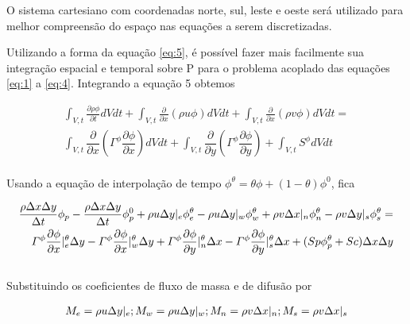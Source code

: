 \documentclass[]{article}
\begin{document}
O sistema cartesiano com coordenadas norte, sul, leste e oeste será utilizado para melhor compreensão do espaço nas equações a serem discretizadas.

Utilizando a forma da equação \eqref{eq:5}, é possível fazer mais facilmente sua integração espacial e temporal sobre P para o problema acoplado das equações \eqref{eq:1} a \eqref{eq:4}. Integrando a equação 5 obtemos

\begin{equation}
	\begin{aligned}
		\int_{V,t}\frac{\partial \rho \phi}{\partial t} dVdt + \int_{V,t}\frac{\partial}{\partial x}(\rho u\phi) dVdt + \int_{V,t}\frac{\partial}{\partial x}(\rho v\phi) dVdt =\\ \int_{V,t}\dfrac{\partial}{\partial x}(\varGamma^{\phi} \dfrac{\partial \phi}{\partial x}) dVdt + \int_{V,t}\dfrac{\partial}{\partial y}(\varGamma^{\phi} \dfrac{\partial \phi}{\partial y}) + \int_{V,t}S^{\phi} dVdt
	\end{aligned}
	\label{eq:5}	
\end{equation}\\

Usando a equação de interpolação de tempo $\phi^{\theta} = \theta\phi + (1-\theta)\phi^{0}$, fica 

\begin{equation}
	\begin{aligned}
		\frac{\rho \Delta x \Delta y }{\Delta t}\phi_{p} - \frac{\rho \Delta x \Delta y }{\Delta t}\phi_{p}^{0} + \rho u \Delta y\arrowvert_{e} \phi_{e}^{\theta} - \rho u \Delta y\arrowvert_{w}\phi_{w}^{\theta}  + \rho v \Delta x\arrowvert_{n}\phi_{n}^{\theta}  - \rho v \Delta y\arrowvert_{s}\phi_{s}^{\theta}  =\\
		\varGamma^{\phi}\frac{\partial \phi}{\partial x}|_{e}^{\theta}\Delta y - 
		\varGamma^{\phi}\frac{\partial \phi}{\partial x}|_{w}^{\theta}\Delta y + 
		\varGamma^{\phi}\frac{\partial \phi}{\partial y}|_{n}^{\theta}\Delta x - 
		\varGamma^{\phi}\frac{\partial \phi}{\partial y}|_{s}^{\theta}\Delta x + (Sp\phi_{p}^{\theta} + Sc)\Delta x \Delta y
	\end{aligned}		
\end{equation}\\

Substituindo os coeficientes de fluxo de massa e de difusão por

\begin{equation*}
	\begin{aligned}
		M_e = \rho u \Delta y\arrowvert_{e} ; M_w = \rho u \Delta y\arrowvert_{w} ; M_n = \rho v \Delta x\arrowvert_{n} ; M_s = \rho v \Delta x\arrowvert_{s}
	\end{aligned}		
\end{equation*}
\end{document}
